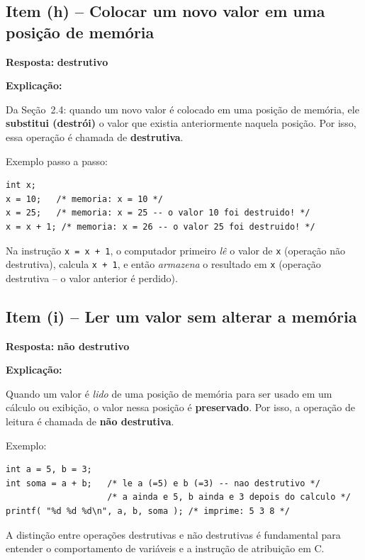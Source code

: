 \documentclass[12pt,a4paper]{article}
\begin{document}
\subsection*{Item (h) -- Colocar um novo valor em uma posição de memória}

\begin{respostabox}
\textbf{Resposta:} \textcolor{deitelblue}{\textbf{destrutivo}}

\medskip\textbf{Explicação:}

Da Seção~2.4: quando um novo valor é colocado em uma posição de memória, ele
\textbf{substitui (destrói)} o valor que existia anteriormente naquela posição.
Por isso, essa operação é chamada de \textbf{destrutiva}.

\medskip Exemplo passo a passo:

\begin{lstlisting}
int x;
x = 10;   /* memoria: x = 10 */
x = 25;   /* memoria: x = 25 -- o valor 10 foi destruido! */
x = x + 1; /* memoria: x = 26 -- o valor 25 foi destruido! */
\end{lstlisting}

Na instrução \texttt{x = x + 1}, o computador primeiro \textit{lê} o valor de \texttt{x}
(operação não destrutiva), calcula \texttt{x + 1}, e então \textit{armazena} o resultado
em \texttt{x} (operação destrutiva -- o valor anterior é perdido).
\end{respostabox}

\subsection*{Item (i) -- Ler um valor sem alterar a memória}

\begin{respostabox}
\textbf{Resposta:} \textcolor{deitelblue}{\textbf{não destrutivo}}

\medskip\textbf{Explicação:}

Quando um valor é \textit{lido} de uma posição de memória para ser usado em um cálculo
ou exibição, o valor nessa posição é \textbf{preservado}. Por isso, a operação de leitura
é chamada de \textbf{não destrutiva}.

\medskip Exemplo:
\begin{lstlisting}
int a = 5, b = 3;
int soma = a + b;   /* le a (=5) e b (=3) -- nao destrutivo */
                    /* a ainda e 5, b ainda e 3 depois do calculo */
printf( "%d %d %d\n", a, b, soma ); /* imprime: 5 3 8 */
\end{lstlisting}

A distinção entre operações destrutivas e não destrutivas é fundamental para entender
o comportamento de variáveis e a instrução de atribuição em C.
\end{respostabox}
\end{document}
